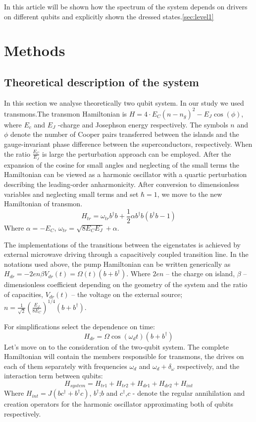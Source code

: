 \documentclass[%
 aip,
 amsmath,amssymb,
 reprint,%
]{revtex4-1}
\begin{document}
In this article will be shown how the spectrum of the system depends on drivers on different qubits and explicitly shown the dressed states.\autoref{sec:level1}
 
\section{Methods}
\subsection{Theoretical description of the system}
In this section we analyse theoretically two qubit system.
 In our study we used transmons.The transmon Hamiltonian is $H = 4\cdot E_C(n-n_g)^2 -E_J\cos(\phi)$, where $E_c $ and $E_J$ -charge and Josephson energy respectively. The symbols $n$ and $\phi$ denote the number of Cooper pairs transferred between the islands and the
 gauge-invariant phase difference between the superconductors,
 respectively.
 When the ratio $\frac{E_C}{E_J}$ is large the perturbation approach can
 be employed. After the expansion of the cosine for small angles and neglecting of the small terms the Hamiltonian can be
 viewed as a harmonic oscillator with a quartic perturbation describing the leading-order anharmonicity.
 After conversion to dimensionless variables and neglecting small terms and set $\hbar = 1$, we move to the new Hamiltonian of transmon. 
\begin{equation}
H_{tr}= \omega_{tr} b^{\dagger}b +\frac{1}{2}\alpha b^{\dagger}b(b^{\dagger}b-1)
\end{equation}
Where $\alpha=-E_C$, $\omega_{tr}=\sqrt{8E_CE_J}+\alpha$.


The implementations of the transitions between the eigenstates is achieved by external microwave driving through a capacitively coupled transition line. In the notations used above, the pump Hamiltonian can be written generically as $ 	H_{dr} = -2e n\beta V_{dr}(t)=\Omega(t)(b+b^{\dagger})$.
Where $2en$ -- the charge on island, $\beta$ -- dimensionless coefficient depending on the geometry of the system and the ratio of capacities, $V_{dr}(t)$ -- the voltage on the external source; $n =\frac{1}{\sqrt{2}} (\frac{E_J}{8E_C})^{1/4}(b+b^{\dagger})$.

For simplifications select the dependence on time:
\begin{equation}
H_{dr} = \Omega\cos(\omega_d t)(b+b^{\dagger})
\end{equation}
Let's move on to the consideration of the two-qubit system. The complete Hamiltonian will contain the members responsible for transmons, the drives on each of them separately with frequencies $\omega_d$ and $\omega_d+\delta_{\omega}$ respectively, and the interaction term between qubits:
\begin{equation}\label{Hsystem}
H_{system}= H_{tr1}+H_{tr2}+H_{dr1}+H_{dr2}+H_{int}
\end{equation}
Where $H_{int}= J(bc^{\dagger}+b^{\dagger}c)$, $b^{\dagger}$;$b$ and $c^{\dagger}$,$c$ - denote the regular annihilation and creation operators
for the harmonic oscillator approximating both of qubits respectively.
\end{document}
